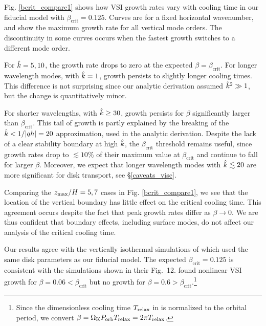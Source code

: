 Fig. \ref{bcrit_compare1} shows how VSI growth rates vary with cooling time 
in our fiducial model with $\beta_\mathrm{crit} = 0.125$.  
Curves are for a fixed horizontal wavenumber, and show the maximum growth rate for all vertical mode orders.  The 
discontinuity in some curves occurs when the fastest growth switches to a different mode order.

For $\hat{k} = 5, 10$, the growth rate drops to zero at the expected $\beta = \beta_\mathrm{crit}$.
For longer wavelength modes, with $\hat{k} = 1$, growth persists to slightly longer cooling times.  
This difference is not surprising since our analytic derivation assumed $\hat{k}^2 \gg1$, but  
the change is quantitatively minor.

For shorter wavelengths, with $\hat{k} \geq 30$, growth persists for $\beta$ significantly larger
than $\beta_\mathrm{crit}$.  This tail of growth is partly explained by the breaking of the $\hat{k} < 1/|qh| = 20$ 
approximation, used in  the analytic derivation.  Despite the lack of a clear stability boundary 
at high $\hat{k}$, the $\beta_\mathrm{crit}$ threshold remains useful, since growth rates drop to 
$\lesssim 10\%$ of  their maximum value at  $\beta_\mathrm{crit}$ and continue to fall for larger $\beta$. 
 Moreover, we expect that longer wavelength modes with $\hat{k} \lesssim 20$
are more significant for disk transport, see \S\ref{caveats_visc}.

Comparing the $z_\mathrm{max}/H = 5, 7$ cases in Fig. \ref{bcrit_compare1}, we see that the location of the vertical
boundary has little effect on the critical cooling time.  This agreement occurs despite the fact that peak growth rates
differ as $\beta \to 0$.  We are thus confident that boundary effects, including surface modes, do not
affect our analysis of the critical cooling time.

Our results agree with the vertically isothermal simulations of  
which used the same disk parameters as our fiducial model.  The expected $\beta_\mathrm{crit} = 0.125$ 
is consistent with the simulations shown in their Fig.\ 12.    
found nonlinear VSI growth for $\beta = 0.06< \beta_\mathrm{crit}$ but no growth for 
  $\beta = 0.6 > \beta_\mathrm{crit}$.\footnote{Since the dimensionless cooling time $T_{\rm relax}$ in 
  is normalized to the orbital period, we convert $\beta = \Omega_{\rm K} P_{\rm orb} T_{\rm relax} = 2 \pi T_{\rm relax}$.}

